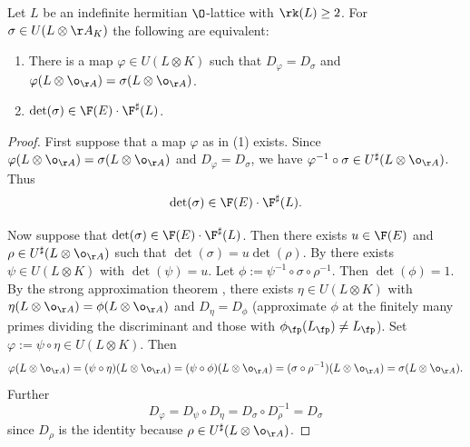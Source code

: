 \begin{proposition}\label{kernel:global}
 Let $L$ be an indefinite hermitian $\O$-lattice with $\rk(L)\geq 2$.
  For $\sigma \in U(L\otimes \AA_K)$ the following are equivalent:
 \begin{enumerate}
   \item There is a map $\varphi \in U(L \otimes K)$ such that $D_\varphi=D_\sigma$ and $\varphi(L \otimes \o_{\AA})=\sigma(L\otimes \o_{\AA})$.
  \item $\det(\sigma) \in \F(E)\cdot \F^\sharp(L)$.
 \end{enumerate}
\end{proposition}
\begin{proof}
  First suppose that a map $\varphi$ as in (1) exists.
  Since $\varphi(L\otimes \o_{\AA})=\sigma(L\otimes \o_{\AA})$ and $D_\varphi = D_\sigma$, we have $\varphi^{-1} \circ \sigma \in U^\sharp(L\otimes \o_{\AA})$.
  Thus
\[\det(\sigma) \in\F(E)\cdot \F^\sharp(L).\]

Now suppose that $\det(\sigma) \in \F(E)\cdot \F^\sharp(L)$.
Then there exists $u \in \F(E)$ and $\rho \in U^\sharp(L \otimes {\o_{\AA}})$ such that
$\det(\sigma) = u \det(\rho)$. By  there exists $\psi \in U(L\otimes K)$ with $\det(\psi)=u$.
Let $\phi := \psi^{-1} \circ \sigma \circ \rho^{-1}$.
Then $\det(\phi)=1$.
By the strong approximation theorem \cite{kneser1966}, there exists
$\eta \in U(L\otimes K)$ with $\eta(L \otimes \o_{\AA})=\phi(L\otimes \o_{\AA})$ and $D_\eta = D_\phi$
(approximate $\phi$ at the finitely many primes dividing the discriminant and those with $\phi_\fp(L_\fp)\neq L_\fp$).
Set $\varphi := \psi \circ \eta \in U(L \otimes K)$.
Then
\[\varphi(L\otimes \o_{\AA}) = (\psi \circ \eta)(L\otimes \o_{\AA}) = (\psi \circ \phi)(L\otimes \o_{\AA}) = (\sigma \circ \rho^{-1})(L\otimes \o_{\AA})=\sigma(L\otimes \o_{\AA}).\]
  Further
\[D_{\varphi} =D_{\psi} \circ D_{\eta}= D_{\sigma} \circ D_{\rho}^{-1} = D_{\sigma}\]
since $D_{\rho}$ is the identity because $\rho\in U^\sharp(L \otimes \o_{\AA})$.
\end{proof}


